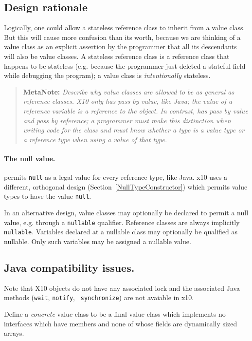 \documentclass{article}
\def\ccfont{\sf}
\def\x10{{\ccfont x10}}
\def\X10{{\ccfont X10}}
\def\java{{\sc Java}}
\newcommand \metanote[1] {\begin{quotation}{\bf MetaNote:} {\footnotesize\em #1}\end{quotation}}
\begin{document}
\subsection{Design rationale}
Logically, one could allow a stateless reference class to inherit from
a value class. But this will cause more confusion than its worth,
because we are thinking of a value class as an explicit assertion by
the programmer that all its descendants will also be value classes. A
stateless reference class is a reference class that happens to be
stateless (e.g. because the programmer just deleted a stateful field
while debugging the program); a value class is {\em intentionally}
stateless.

\metanote{Describe why value classes are allowed to be as general as
reference classes. X10 only has pass by value, like \java; the value
of a reference variable is a reference to the object. In contrast,
\csharp{} has pass by value and pass by reference; a programmer must
make this distinction when writing code for the class and must know
whether a type is a value type or a reference type when using a value
of that type.  
}

\paragraph{The null value.}
\csharp{} permits {\tt null} as a legal value for every reference
type, like \java{}. \x10{} uses a different, orthogonal design
(Section~\ref{NullTypeConstructor}) which permits value types to have
the value {\tt null}.

In an alternative design, value classes may optionally be declared to
permit a null value, e.g.{} through a {\tt nullable}
qualifier. Reference classes are always implicitly {\tt
nullable}. Variables declared at a nullable class may optionally be
qualified as nullable. Only such variables may be assigned a nullable
value. 

\subsection{\java{} compatibility issues.}
Note that \X10{} objects do not have any associated lock and the
associated \java{} methods ({\tt wait}, {\tt notify}, {\tt
synchronize}) are not avaiable in \x10. 

Define a {\em concrete} value class to be a final value class which
implements no interfaces which have members and none of whose fields
are dynamically sized arrays.
\end{document}
